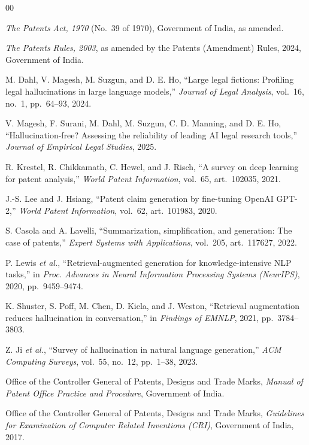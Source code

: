 \documentclass[conference]{IEEEtran}
\begin{document}
\begin{thebibliography}{00}

 \emph{The Patents Act, 1970} (No.~39 of 1970), Government of India, as amended.

 \emph{The Patents Rules, 2003}, as amended by the Patents (Amendment) Rules, 2024, Government of India.

 M. Dahl, V. Magesh, M. Suzgun, and D. E. Ho, ``Large legal fictions: Profiling legal hallucinations in large language models,'' \emph{Journal of Legal Analysis}, vol.~16, no.~1, pp.~64--93, 2024.

 V. Magesh, F. Surani, M. Dahl, M. Suzgun, C. D. Manning, and D. E. Ho, ``Hallucination-free? Assessing the reliability of leading AI legal research tools,'' \emph{Journal of Empirical Legal Studies}, 2025.

 R. Krestel, R. Chikkamath, C. Hewel, and J. Risch, ``A survey on deep learning for patent analysis,'' \emph{World Patent Information}, vol.~65, art.~102035, 2021.

 J.-S. Lee and J. Hsiang, ``Patent claim generation by fine-tuning OpenAI GPT-2,'' \emph{World Patent Information}, vol.~62, art.~101983, 2020.

 S. Casola and A. Lavelli, ``Summarization, simplification, and generation: The case of patents,'' \emph{Expert Systems with Applications}, vol.~205, art.~117627, 2022.

 P. Lewis \emph{et al.}, ``Retrieval-augmented generation for knowledge-intensive NLP tasks,'' in \emph{Proc. Advances in Neural Information Processing Systems (NeurIPS)}, 2020, pp.~9459--9474.

 K. Shuster, S. Poff, M. Chen, D. Kiela, and J. Weston, ``Retrieval augmentation reduces hallucination in conversation,'' in \emph{Findings of EMNLP}, 2021, pp.~3784--3803.

 Z. Ji \emph{et al.}, ``Survey of hallucination in natural language generation,'' \emph{ACM Computing Surveys}, vol.~55, no.~12, pp.~1--38, 2023.

 Office of the Controller General of Patents, Designs and Trade Marks, \emph{Manual of Patent Office Practice and Procedure}, Government of India.

 Office of the Controller General of Patents, Designs and Trade Marks, \emph{Guidelines for Examination of Computer Related Inventions (CRI)}, Government of India, 2017.


\end{thebibliography}
\end{document}
